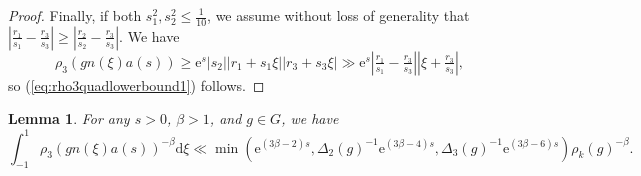 \documentclass[12pt]{amsart}
\newtheorem{lem}[thm]{Lemma}
\theoremstyle{definition}
\theoremstyle{remark}
\numberwithin{equation}{section}
\newcommand{\dd}{\mathrm{d}}
\newcommand{\e}{\mathrm{e}}
\begin{document}
\begin{proof}
  Finally, if both $s_1^2, s_2^2 \leq \tfrac{1}{10}$, we assume without loss of generality that $|\tfrac{r_1}{s_1} - \tfrac{r_3}{s_3}| \geq |\tfrac{r_2}{s_2} - \tfrac{r_3}{s_3}|$.
  We have
  \begin{equation}
    \label{eq:rho3quadlowerbound5}
    \rho_3(gn(\xi)a(s)) \geq \e^s |s_2| |r_1 + s_1 \xi| |r_3 + s_3 \xi| \gg \e^s |\tfrac{r_1}{s_1} - \tfrac{r_3}{s_3}||\xi + \tfrac{r_3}{s_3}|,
  \end{equation}
  so (\ref{eq:rho3quadlowerbound1}) follows. 
\end{proof}

\begin{lem}
  \label{lem:rhocontraction}
  For any $s > 0$, $\beta > 1$, and $g \in G$, we have
  \begin{equation}
    \label{eq:loccontraction}
    \int_{-1}^1 \rho_3 (g n(\xi) a(s))^{-\beta} \dd \xi 
    \ll \min (\e^{(3\beta -2)s}, \Delta_2(g)^{-1} \e^{(3\beta - 4)s}, \Delta_3(g)^{-1} \e^{(3\beta -6)s}) \rho_k(g)^{-\beta}.
  \end{equation}
\end{lem}
\end{document}
